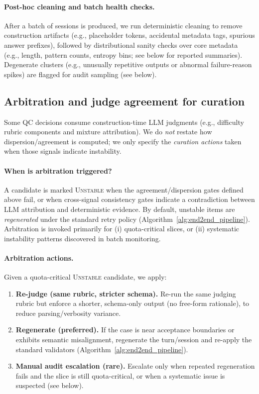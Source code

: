 \paragraph{Post-hoc cleaning and batch health checks.}
After a batch of sessions is produced, we run deterministic cleaning to remove construction artifacts (e.g., placeholder tokens, accidental metadata tags, spurious answer prefixes), followed by distributional sanity checks over core metadata (e.g., length, pattern counts, entropy bins; see below for reported summaries).
Degenerate clusters (e.g., unusually repetitive outputs or abnormal failure-reason spikes) are flagged for audit sampling (see below).

\subsection{Arbitration and judge agreement for curation}
\label{app:data_quality_arbitration}

Some QC decisions consume construction-time LLM judgments (e.g., difficulty rubric components and mixture attribution).
We do \emph{not} restate how dispersion/agreement is computed; we only specify the \emph{curation actions} taken when those signals indicate instability.

\paragraph{When is arbitration triggered?}
A candidate is marked \textsc{Unstable} when the agreement/dispersion gates defined above fail, or when cross-signal consistency gates indicate a contradiction between LLM attribution and deterministic evidence.
By default, unstable items are \emph{regenerated} under the standard retry policy (Algorithm~\ref{alg:end2end_pipeline}).
Arbitration is invoked primarily for (i) quota-critical slices, or (ii) systematic instability patterns discovered in batch monitoring.

\paragraph{Arbitration actions.}
Given a quota-critical \textsc{Unstable} candidate, we apply:
\begin{enumerate}
    \item \textbf{Re-judge (same rubric, stricter schema).} Re-run the same judging rubric but enforce a shorter, schema-only output (no free-form rationale), to reduce parsing/verbosity variance.
    \item \textbf{Regenerate (preferred).} If the case is near acceptance boundaries or exhibits semantic misalignment, regenerate the turn/session and re-apply the standard validators (Algorithm~\ref{alg:end2end_pipeline}).
    \item \textbf{Manual audit escalation (rare).} Escalate only when repeated regeneration fails and the slice is still quota-critical, or when a systematic issue is suspected (see below).
\end{enumerate}

